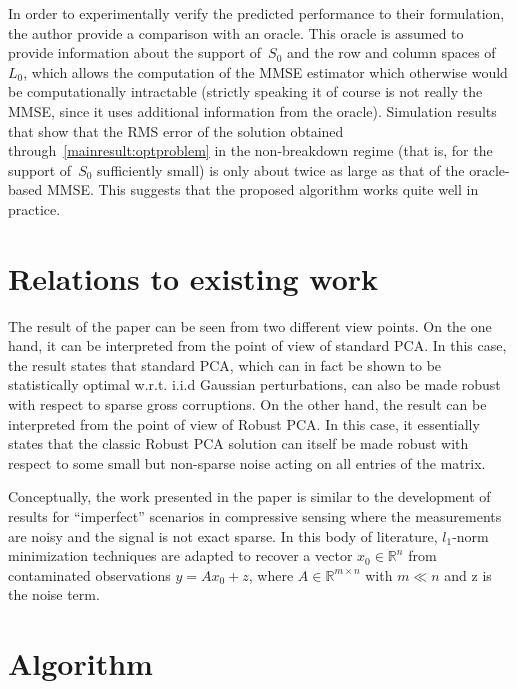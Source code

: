 \documentclass{article}
\begin{document}
In order to experimentally verify the predicted performance to their formulation, the author provide a comparison with an oracle. This oracle is assumed to provide information about the support of~$S_0$ and the row and column spaces of~$L_0$, which allows the computation of the MMSE estimator which otherwise would be computationally intractable (strictly speaking it of course is not really the MMSE, since it uses additional information from the oracle). Simulation results that show that the RMS error of the solution obtained through~\eqref{mainresult:optproblem} in the non-breakdown regime (that is, for the support of~$S_0$ sufficiently small) is only about twice as large as that of the oracle-based MMSE. This suggests that the proposed algorithm works quite well in practice. 



\section{Relations to existing work}

The result of the paper can be seen from two different view points. On the one hand, it can be interpreted from the point of view of standard PCA. In this case, the result states that standard PCA, which can in fact be shown to be statistically optimal w.r.t. i.i.d Gaussian perturbations, can also be made robust with respect to sparse gross corruptions. On the other hand, the result can be interpreted from the point of view of Robust PCA. In this case, it essentially states that the classic Robust PCA solution can itself be made robust with respect to some small but non-sparse noise acting on all entries of the matrix. 

Conceptually, the work presented in the paper is similar to the development of results for ``imperfect'' scenarios in compressive sensing where the measurements are noisy and the signal is not exact sparse. In this body of literature, $l_1$-norm minimization techniques are adapted to recover a vector $x_0 \in \mathbb{R}^n$ from contaminated observations $y=Ax_0+z$, where $A \in \mathbb{R}^{m\times n}$ with $m \ll n$ and z is the noise term. 


\section{Algorithm}
\end{document}
